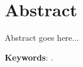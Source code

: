 \documentclass[bookType,partialBuild]{../ThesisClass/ThesisClass}
\begin{document}
\fi
\ifdefined \bookType
	\cleardoublepage
\fi



\chapter*{Abstract}

\vspace{-0.2cm}


Abstract goes here...

\vspace{0.7cm}

\ifdefined \fullBuild
\noindent \textbf{Keywords}: \ThesisKeywords.
\fi



\ifdefined \partialBuild
	
\end{document}
